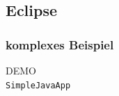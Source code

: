 \documentclass{beamer}
\begin{document}
%  

  \subsection{Eclipse}
  \begin{frame}\frametitle{komplexes Beispiel}
    \centering
    \Huge{DEMO}\\
    \centering
    \normalsize{\texttt{SimpleJavaApp}}\\
  \end{frame}
\end{document}
